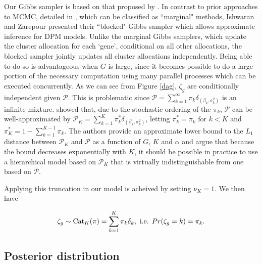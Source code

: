 {Our Gibbs sampler is based on that proposed by \citet{ishwaran2000}. In contrast to prior approaches to MCMC, detailed in \citet{neal2000}, which can be classified as ``marginal" methods, Ishwaran and Zarepour presented their ``blocked" Gibbs sampler which allows approximate inference for DPM models. Unlike the marginal Gibbs samplers, which update the cluster allocation for each
`gene', conditional on all other allocations, the blocked sampler jointly updates all cluster allocations independently. Being able to do so is advantageous when $G$ is large, since it becomes possible to do a large portion of the necessary computation using many parallel processes which can be executed concurrently. As we can see from Figure \ref{dag}, $\zeta_g$ are conditionally independent given $\mathcal{P}$. This is problematic since $\mathcal{P}=\sum_{k=1}^\infty \pi_k \delta_{(\beta_k,\sigma^2_k)}$ is an infinite mixture. \cite{ishwaran2001} showed that, due to the stochastic ordering of the $\pi_k$, $\mathcal{P}$ can be well-approximated by $\mathcal{P}_K=\sum_{k=1}^K \pi^*_k \delta_{(\beta_k,\sigma^2_k)}$, letting $\pi_k^*=\pi_k$ for $k<K$ and $\pi_K^* = 1-\sum_{k=1}^{K-1} \pi_k$. The authors provide an approximate lower bound to the $L_1$ distance between $\mathcal{P}_K$ and $\mathcal{P}$ as a function of $G$, $K$ and $\alpha$ and argue that because the bound decreases exponentially with $K$, it should be possible in practice to use a hierarchical model based on $\mathcal{P}_K$ that is virtually indistinguishable from one based on $\mathcal{P}$.

Applying this truncation in our model is acheived by setting $\nu_K=1$. We then have

\begin{equation*}
\zeta_g \sim \operatorname{Cat}_K(\pi) = \sum_{k=1}^K \pi_k \delta_{k}, \mbox{ i.e. } Pr(\zeta_g=k)=\pi_k.
\end{equation*}



\subsection{Posterior distribution}
\label{subsec:posterior}


}
